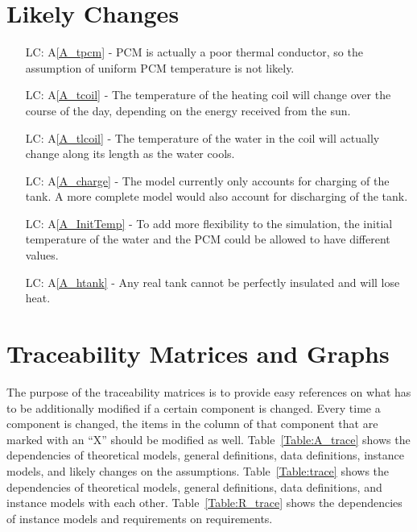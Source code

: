 \documentclass[12pt]{article}
\newcommand{\aref}[1]{A\ref{#1}}
\newcounter{lcnum} %
\begin{document}
\section{Likely Changes}    

\noindent \begin{itemize}

\item[LC\refstepcounter{lcnum}\thelcnum\label{LC_tpcm}:]\aref{A_tpcm} - PCM is
  actually a poor thermal conductor, so the assumption of uniform PCM
  temperature is not likely.

\item[LC\refstepcounter{lcnum}\thelcnum \label{LC_tcoil}:]\aref{A_tcoil} - The
  temperature of the heating coil will change over the course of the day,
  depending on the energy received from the sun.

\item[LC\refstepcounter{lcnum}\thelcnum \label{LC_tlcoil}:]\aref{A_tlcoil} - The
  temperature of the water in the coil will actually change along its length as
  the water cools.

\item[LC\refstepcounter{lcnum}\thelcnum \label{LC_charge}:]\aref{A_charge} - The
  model currently only accounts for charging of the tank.  A more complete model
  would also account for discharging of the tank.

\item[LC\refstepcounter{lcnum}\thelcnum \label{LC_InitTemp}:]\aref{A_InitTemp} - To
  add more flexibility to the simulation, the initial temperature of the water
  and the PCM could be allowed to have different values.

\item[LC\refstepcounter{lcnum}\thelcnum \label{LC_htank}:]\aref{A_htank} - Any
  real tank cannot be perfectly insulated and will lose heat.

\end{itemize}

\section{Traceability Matrices and Graphs}
The purpose of the traceability matrices is to provide easy references on what has to be 
additionally modified if a certain component is changed.  Every time a 
component is changed, the items in the column of that component that are 
marked with an ``X'' should be modified as well. Table~\ref{Table:A_trace} shows
the dependencies of theoretical models, general definitions, data definitions, 
instance models, and likely changes on the assumptions. Table~\ref{Table:trace}
shows the dependencies of theoretical models, general definitions, data
definitions, and instance models with each other. Table~\ref{Table:R_trace} shows
the dependencies of instance models and requirements on requirements.\par
\end{document}
